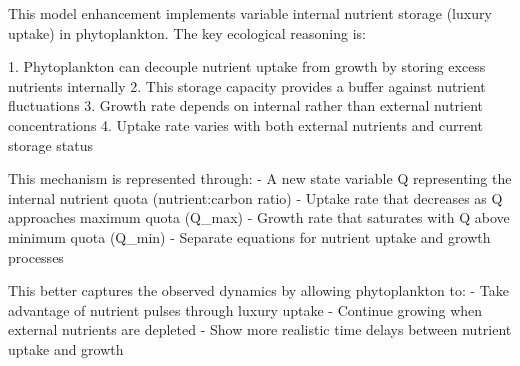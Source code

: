 This model enhancement implements variable internal nutrient storage (luxury uptake) in phytoplankton. The key ecological reasoning is:

1. Phytoplankton can decouple nutrient uptake from growth by storing excess nutrients internally
2. This storage capacity provides a buffer against nutrient fluctuations
3. Growth rate depends on internal rather than external nutrient concentrations
4. Uptake rate varies with both external nutrients and current storage status

This mechanism is represented through:
- A new state variable Q representing the internal nutrient quota (nutrient:carbon ratio)
- Uptake rate that decreases as Q approaches maximum quota (Q_max)
- Growth rate that saturates with Q above minimum quota (Q_min)
- Separate equations for nutrient uptake and growth processes

This better captures the observed dynamics by allowing phytoplankton to:
- Take advantage of nutrient pulses through luxury uptake
- Continue growing when external nutrients are depleted
- Show more realistic time delays between nutrient uptake and growth
